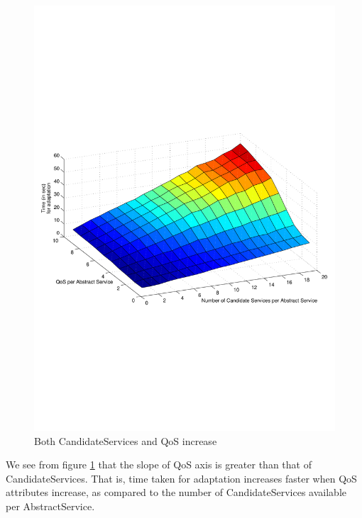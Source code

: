 \documentclass[10pt,journal,compsoc]{IEEEtran}
\begin{document}
\begin{figure}[htbp]
\centering
\includegraphics[clip, trim=2cm 9cm 2cm 12cm, scale=0.5]{graphs/scaling_time_svcs_qos.pdf}
\caption{Both CandidateServices and QoS increase \label{fig:svc_and_qos_scaling}}
\end{figure}

We see from figure \ref{fig:svc_and_qos_scaling} that the slope of QoS axis is greater than that of CandidateServices. That is, time taken for adaptation increases faster when QoS attributes increase, as compared to the number of CandidateServices available per AbstractService.
\end{document}
